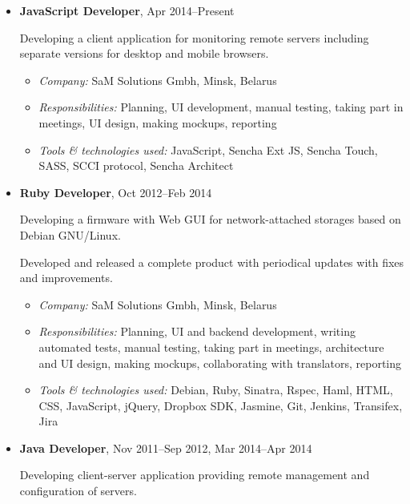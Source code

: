 \documentclass[a4paper, 12pt]{article}
\newcommand{\position}[1]{
    \textbf{#1}}
\newcommand{\itemlabel}[1]{
    \textit{#1:}}
\begin{document}
    \begin{itemize}

        \item \position{JavaScript Developer}, Apr 2014--Present

            Developing a client application for monitoring remote servers including separate versions for desktop and mobile browsers.

            \begin{itemize}
                \item \itemlabel{Company} SaM Solutions Gmbh, Minsk, Belarus
                \item \itemlabel{Responsibilities} Planning, UI development, manual testing, taking part in meetings, UI design, making mockups, reporting
                \item \itemlabel{Tools \& technologies used} JavaScript, Sencha Ext JS, Sencha Touch, SASS, SCCI protocol, Sencha Architect
            \end{itemize}

        \item \position{Ruby Developer}, Oct 2012--Feb 2014

            Developing a firmware with Web GUI for network-attached storages based on Debian GNU/Linux.

            Developed and released a complete product with periodical updates with fixes and improvements.

            \begin{itemize}
                \item \itemlabel{Company} SaM Solutions Gmbh, Minsk, Belarus
                \item \itemlabel{Responsibilities} Planning, UI and backend development, writing automated tests, manual testing, taking part in meetings, architecture and UI design, making mockups, collaborating with translators, reporting
                \item \itemlabel{Tools \& technologies used} Debian, Ruby, Sinatra, Rspec, Haml, HTML, CSS, JavaScript, jQuery, Dropbox SDK, Jasmine, Git, Jenkins, Transifex, Jira
            \end{itemize}


        \item \position{Java Developer}, Nov 2011--Sep 2012, Mar 2014--Apr 2014

            Developing client-server application providing remote management and configuration of servers.


\end{itemize}
\end{document}
